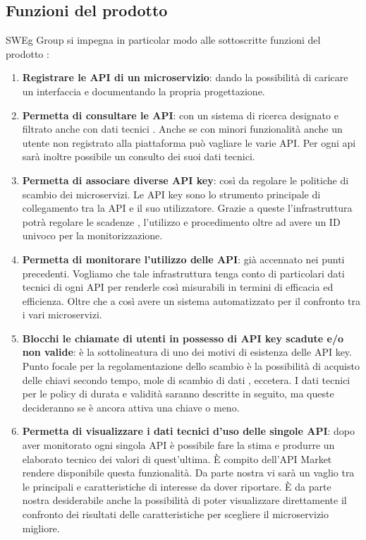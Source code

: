 \documentclass[12pt,a4paper,titlepage]{article}
\begin{document}
\subsection{Funzioni del prodotto}
SWEg Group si impegna in particolar modo alle sottoscritte funzioni del prodotto :
\begin{enumerate}
\item \textbf{Registrare le API di un microservizio}:	dando la possibilità di caricare un interfaccia e documentando la propria progettazione.
\item \textbf{Permetta di consultare le API}:	con un sistema di ricerca designato e filtrato anche con dati tecnici . Anche se con minori funzionalità anche un utente non registrato alla piattaforma può vagliare le varie API. Per ogni api sarà inoltre possibile un consulto dei suoi dati tecnici.
\item \textbf{Permetta di associare diverse API key}: così da regolare le politiche di scambio dei microservizi. Le API key sono lo strumento principale di collegamento tra la API e il suo utilizzatore. Grazie a queste l'infrastruttura potrà regolare le scadenze , l'utilizzo e procedimento oltre ad avere un ID univoco per la monitorizzazione. 
\item \textbf{Permetta di monitorare l'utilizzo delle API}:	già accennato nei punti precedenti. Vogliamo che tale infrastruttura tenga conto di particolari dati tecnici di ogni API per renderle così misurabili in termini di efficacia ed efficienza. Oltre che a così avere un sistema automatizzato per il confronto tra i vari microservizi.
\item \textbf{Blocchi le chiamate di utenti in possesso di API key scadute e/o non valide}:	è la sottolineatura di uno dei motivi di esistenza delle API key. Punto focale per la regolamentazione dello scambio è la possibilità di acquisto delle chiavi secondo tempo, mole di scambio di dati , eccetera. I dati tecnici per le policy di durata e validità saranno descritte in seguito, ma queste decideranno se è ancora attiva una chiave o meno.
\item \textbf{Permetta di visualizzare i dati tecnici d'uso delle singole API}:	dopo aver monitorato ogni singola API è possibile fare la stima e produrre un elaborato tecnico dei valori di quest'ultima. È compito dell'API Market rendere disponibile questa funzionalità. Da parte nostra vi sarà un vaglio tra le principali e caratteristiche di interesse da dover riportare. È da parte nostra desiderabile anche la possibilità di poter visualizzare direttamente il confronto dei risultati delle caratteristiche per scegliere il microservizio migliore.

\end{enumerate}
\end{document}
